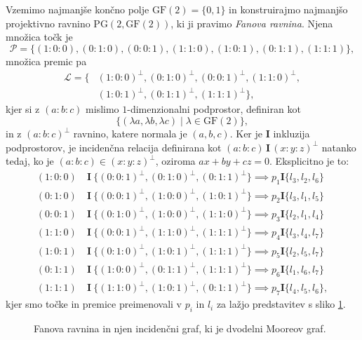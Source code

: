 \documentclass[fin1, tisk]{fmfdelo}
\newcommand{\II}{\mathbf{I}}
\newcommand{\PP}{\mathcal{P}}
\newcommand{\LL}{\mathcal{L}}
\newcommand{\PG}{\mathrm{PG}}
\newcommand{\GF}{\mathrm{GF}}
\begin{document}
\begin{zgled}
    Vzemimo najmanjše končno polje $\GF(2) = \{0,1\}$ in konstruirajmo najmanjšo projektivno ravnino $\PG(2, \GF(2))$,
    ki ji pravimo \emph{Fanova ravnina}. Njena množica točk je 
    \[\PP = \{(1:0:0), (0:1:0), (0:0:1), (1:1:0), (1:0:1), (0:1:1), (1:1:1)\},\]
    množica premic pa 
    \begin{align*}\LL = \{&(1:0:0)^{\perp}, (0:1:0)^{\perp}, (0:0:1)^{\perp}, (1:1:0)^{\perp}, 
        \\&(1:0:1)^{\perp}, (0:1:1)^{\perp}, (1:1:1)^{\perp}\},\end{align*}
    kjer si z $(a:b:c)$ mislimo $1$-dimenzionalni podprostor, definiran kot $$\{(\lambda a, \lambda b, \lambda c) \mid\lambda\in \GF(2)\},$$
    in z $(a:b:c)^{\perp}$ ravnino, katere normala je $(a,b,c)$. Ker je $\II$ inkluzija podprostorov, 
    je incidenčna relacija definirana kot $(a:b:c) \, \II \, (x:y:z)^{\perp}$ natanko tedaj, 
    ko je $(a:b:c) \in (x:y:z)^{\perp}$, oziroma $a x + b y + c z = 0$. Eksplicitno je to:
    \begin{align*}
    (1:0:0) & \ \II \ \{ (0:0:1)^\perp, (0:1:0)^\perp, (0:1:1)^\perp \} \implies p_1 \II \{l_3, l_2, l_6\}\\
    (0:1:0) & \ \II \ \{ (0:0:1)^\perp, (1:0:0)^\perp, (1:0:1)^\perp \} \implies p_2 \II \{l_3, l_1, l_5\}\\
    (0:0:1) & \ \II \ \{ (0:1:0)^\perp, (1:0:0)^\perp, (1:1:0)^\perp \} \implies p_3 \II \{l_2, l_1, l_4\}\\
    (1:1:0) & \ \II \ \{ (0:0:1)^\perp, (1:1:0)^\perp, (1:1:1)^\perp \} \implies p_4 \II \{l_3, l_4, l_7\}\\
    (1:0:1) & \ \II \ \{ (0:1:0)^\perp, (1:0:1)^\perp, (1:1:1)^\perp \} \implies p_5 \II \{l_2, l_5, l_7\}\\
    (0:1:1) & \ \II \ \{ (1:0:0)^\perp, (0:1:1)^\perp, (1:1:1)^\perp \} \implies p_6 \II \{l_1, l_6, l_7\}\\
    (1:1:1) & \ \II \ \{ (1:1:0)^\perp, (1:0:1)^\perp, (0:1:1)^\perp \} \implies p_7 \II \{l_4, l_5, l_6\},
\end{align*} %
kjer smo točke in premice preimenovali v $p_i$ in $l_i$ za lažjo predstavitev s sliko \ref{fig:fano_pg2}.
\end{zgled}

\begin{figure}[ht]
    \centering
    \def\svgwidth{\columnwidth}
    \caption{Fanova ravnina in njen incidenčni graf, ki je dvodelni Mooreov graf.}
    \label{fig:fano_pg2}
\end{figure}
\end{document}
